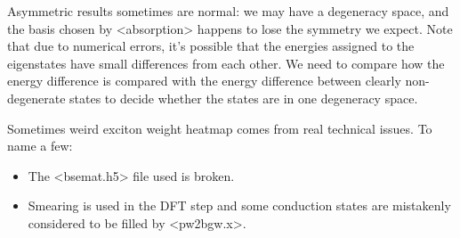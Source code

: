 \documentclass[hyperref, a4paper, 12pt]{report}
\def\texttt#1{<#1>}%
\newcommand{\shortcode}[1]{\texttt{#1}}
\begin{document}
Asymmetric results sometimes are normal: 
we may have a degeneracy space, 
and the basis chosen by \shortcode{absorption} happens to 
lose the symmetry we expect. 
Note that due to numerical errors, 
it's possible that the energies assigned to the eigenstates 
have small differences from each other.
We need to compare how the energy difference is compared with the 
energy difference between clearly non-degenerate states 
to decide whether the states are in one degeneracy space. 

Sometimes weird exciton weight heatmap 
comes from real technical issues. To name a few: 
\begin{itemize}
    \item The \shortcode{bsemat.h5} file used is broken. 
    \item Smearing is used in the DFT step 
        and some conduction states are mistakenly considered to be filled 
        by \shortcode{pw2bgw.x}. 
\end{itemize}



\end{document}
